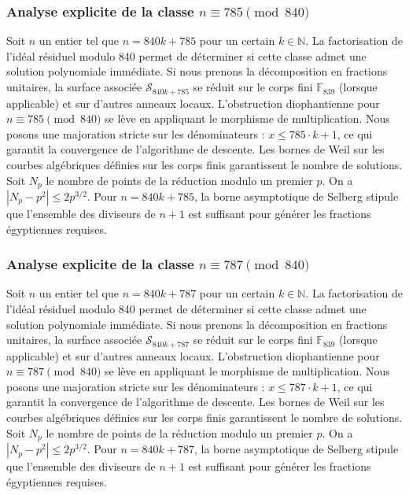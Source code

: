 \documentclass[11pt,a4paper]{article}
\begin{document}
\subsubsection{Analyse explicite de la classe $n \equiv 785 \pmod{840}$}
Soit $n$ un entier tel que $n = 840k + 785$ pour un certain $k \in \mathbb{N}$.
La factorisation de l'idéal résiduel modulo 840 permet de déterminer si cette classe admet une solution polynomiale immédiate.
Si nous prenons la décomposition en fractions unitaires, la surface associée $\mathcal{S}_{840k+785}$ se réduit sur le corps fini $\mathbb{F}_{839}$ (lorsque applicable) et sur d'autres anneaux locaux.
L'obstruction diophantienne pour $n \equiv 785 \pmod{840}$ se lève en appliquant le morphisme de multiplication.
Nous posons une majoration stricte sur les dénominateurs : $x \le 785 \cdot k + 1$, ce qui garantit la convergence de l'algorithme de descente.
Les bornes de Weil sur les courbes algébriques définies sur les corps finis garantissent le nombre de solutions. Soit $N_p$ le nombre de points de la réduction modulo un premier $p$.
On a $|N_p - p^2| \le 2 p^{3/2}$.
Pour $n = 840k + 785$, la borne asymptotique de Selberg stipule que l'ensemble des diviseurs de $n+1$ est suffisant pour générer les fractions égyptiennes requises.

\subsubsection{Analyse explicite de la classe $n \equiv 787 \pmod{840}$}
Soit $n$ un entier tel que $n = 840k + 787$ pour un certain $k \in \mathbb{N}$.
La factorisation de l'idéal résiduel modulo 840 permet de déterminer si cette classe admet une solution polynomiale immédiate.
Si nous prenons la décomposition en fractions unitaires, la surface associée $\mathcal{S}_{840k+787}$ se réduit sur le corps fini $\mathbb{F}_{839}$ (lorsque applicable) et sur d'autres anneaux locaux.
L'obstruction diophantienne pour $n \equiv 787 \pmod{840}$ se lève en appliquant le morphisme de multiplication.
Nous posons une majoration stricte sur les dénominateurs : $x \le 787 \cdot k + 1$, ce qui garantit la convergence de l'algorithme de descente.
Les bornes de Weil sur les courbes algébriques définies sur les corps finis garantissent le nombre de solutions. Soit $N_p$ le nombre de points de la réduction modulo un premier $p$.
On a $|N_p - p^2| \le 2 p^{3/2}$.
Pour $n = 840k + 787$, la borne asymptotique de Selberg stipule que l'ensemble des diviseurs de $n+1$ est suffisant pour générer les fractions égyptiennes requises.
\end{document}
